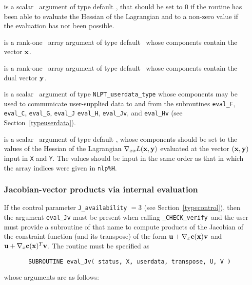 \documentclass{galahad}
\newcommand{\packagename}{CHECK}
\newcommand{\fullpackagename}{\libraryname\_\packagename}
\newcommand{\solver}{{\tt \fullpackagename\_verify}}
\begin{document}
\begin{description}

 is a scalar \intentout\ argument of type default \integer,
that should be set to 0 if the routine has been able to evaluate
the Hessian of the Lagrangian 
and to a non-zero value if the evaluation has not been possible.

 is a rank-one \intentin\ array argument of type default \realdp\
whose components contain the vector ${\mathbf{x}}$.

 is a rank-one \intentin\ array argument of type default \realdp\
whose components contain the dual vector ${\mathbf{y}}$.

 is a scalar \intentinout\ argument of type 
{\tt NLPT\_userdata\_type} whose components may be used
to communicate user-supplied data to and from the
subroutines {\tt eval\_F}, {\tt eval\_C}, {\tt eval\_G}, {\tt eval\_J}
{\tt eval\_H}, {\tt eval\_Jv}, and {\tt eval\_Hv} 
(see Section~\ref{typeuserdata}). 

 is a scalar \intentout\ argument of type default \realdp,
whose components should be set to the values of the Hessian
of the Lagrangian $\nabla_{xx} L({\mathbf{x}},{\mathbf{y}})$
evaluated at the vector $({\mathbf{x}},{\mathbf{y}})$ input in {\tt X} and {\tt Y}. The values should
be input in the same order as that in which the array indices were
given in {\tt nlp\%H}.

\end{description}


\subsubsection{Jacobian-vector products via internal evaluation\label{jvfv}}

If the control parameter {\tt J\_availability} $=3$ (see
Section~\ref{typecontrol}), then the argument {\tt eval\_Jv} must be
present when calling \solver\ and the
user must provide a subroutine of that name to compute
products of the Jacobian of the constraint function (and its transpose)
of the form ${\mathbf{u}} + \nabla_{x} {\mathbf{c}}({\mathbf{x}}){\mathbf{v}}$ and
${\mathbf{u}} + \nabla_{x} {\mathbf{c}}({\mathbf{x}})^T{\mathbf{v}}$.
The routine must be specified as

\def\baselinestretch{0.8}
{\tt \begin{verbatim}
       SUBROUTINE eval_Jv( status, X, userdata, transpose, U, V ) \end{verbatim} }
\def\baselinestretch{1.0}
\noindent whose arguments are as follows:
\end{document}

